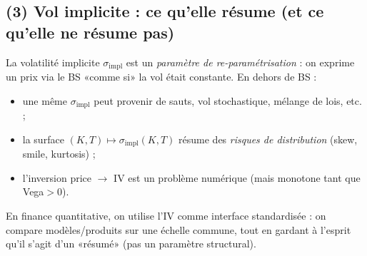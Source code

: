 \subsection*{(3) Vol implicite : ce qu'elle résume (et ce qu'elle ne résume pas)}
La volatilité implicite $\sigma_{\mathrm{impl}}$ est un \emph{paramètre de re-paramétrisation} : on exprime un prix via le BS «comme si» la vol était constante.
En dehors de BS :
\begin{itemize}[leftmargin=*]
\item une même $\sigma_{\mathrm{impl}}$ peut provenir de sauts, vol stochastique, mélange de lois, etc. ;
\item la surface $(K,T)\mapsto \sigma_{\mathrm{impl}}(K,T)$ résume des \emph{risques de distribution} (skew, smile, kurtosis) ;
\item l'inversion price $\to$ IV est un problème numérique (mais monotone tant que Vega$>0$).
\end{itemize}
En finance quantitative, on utilise l'IV comme interface standardisée : on compare modèles/produits sur une échelle commune, tout en gardant à l'esprit qu'il s'agit d'un «résumé» (pas un paramètre structural).
